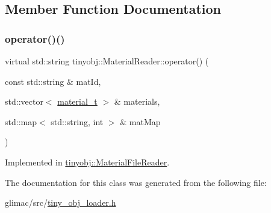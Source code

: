 \subsection{Member Function Documentation}
\mbox{\label{classtinyobj_1_1_material_reader_afc27ac917abd33dc3ec4a9ae7a519962}} 
\subsubsection{\texorpdfstring{operator()()}{operator()()}}
{\footnotesize\ttfamily virtual std\+::string tinyobj\+::\+Material\+Reader\+::operator() (\begin{DoxyParamCaption}\item[{const std\+::string \&}]{mat\+Id,  }\item[{std\+::vector$<$ \hyperlink{structtinyobj_1_1material__t}{material\+\_\+t} $>$ \&}]{materials,  }\item[{std\+::map$<$ std\+::string, int $>$ \&}]{mat\+Map }\end{DoxyParamCaption})\hspace{0.3cm}{\ttfamily [pure virtual]}}



Implemented in \hyperlink{classtinyobj_1_1_material_file_reader_a9374212c9997aa8ac0d15d97f67b25f8}{tinyobj\+::\+Material\+File\+Reader}.



The documentation for this class was generated from the following file\+:\begin{DoxyCompactItemize}
\item 
glimac/src/\hyperlink{tiny__obj__loader_8h}{tiny\+\_\+obj\+\_\+loader.\+h}\end{DoxyCompactItemize}
